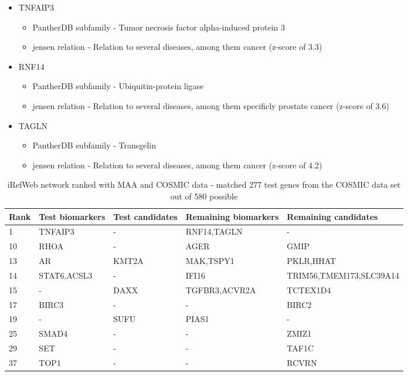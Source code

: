 \begin{itemize}
    \item TNFAIP3
        \begin{itemize}
            \item PantherDB subfamily - Tumor necrosis factor alpha-induced
                protein 3
            \item \gls{jensen} relation - Relation to several diseases, among them
                cancer (z-score of 3.3)
        \end{itemize}
    \item RNF14
        \begin{itemize}
            \item PantherDB subfamily - Ubiquitin-protein ligase
            \item \gls{jensen} relation - Relation to several diseases, among them
                specificly prostate cancer (z-score of 3.6)
        \end{itemize}
    \item TAGLN
        \begin{itemize}
            \item PantherDB subfamily - Transgelin
            \item \gls{jensen} relation - Relation to several diseases, among them
                cancer (z-score of 4.2)
        \end{itemize}
\end{itemize}
\begin{sidewaystable}
    \begin{tabular}{|l|l|l|l|l|}
        \hline
        \textbf{Rank}
        & \textbf{Test biomarkers}
        & \textbf{Test candidates}
        & \textbf{Remaining biomarkers}
        & \textbf{Remaining candidates} \\
        \hline
        1	& TNFAIP3	& -	& RNF14,TAGLN	& - \\
        \hline
        10	& RHOA	& -	& AGER	& GMIP \\
        \hline
        13	& AR	& KMT2A	& MAK,TSPY1	& PKLR,HHAT \\
        \hline
        14	& STAT6,ACSL3	& -	& IFI16	& TRIM56,TMEM173,SLC39A14 \\
        \hline
        15	& -	& DAXX	& TGFBR3,ACVR2A	& TCTEX1D4 \\
        \hline
        17	& BIRC3	& -	& -	& BIRC2 \\
        \hline
        19	& -	& SUFU	& PIAS1	& - \\
        \hline
        25	& SMAD4	& -	& -	& ZMIZ1 \\
        \hline
        29	& SET	& -	& -	& TAF1C \\
        \hline
        37	& TOP1	& -	& -	& RCVRN \\
        \hline
    \end{tabular}
    \caption{iRefWeb network ranked with MAA and COSMIC data - matched 277 test
    genes from the COSMIC data set out of 580 possible}
    \label{tab:maa-cosmic}
\end{sidewaystable}

